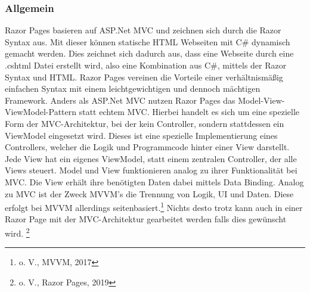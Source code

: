 \documentclass[a4paper,
12pt,
oneside]
{article}
\begin{document}
	\subsubsection{Allgemein}
	Razor Pages basieren auf ASP.Net MVC und zeichnen sich durch die Razor Syntax aus. Mit dieser können statische HTML Webseiten mit C\# dynamisch gemacht werden. Dies zeichnet sich dadurch aus, dass eine Webseite durch eine .cshtml Datei erstellt wird, also eine Kombination aus C\#, mittels der Razor Syntax und HTML. Razor Pages vereinen die Vorteile einer verhältnismäßig einfachen Syntax mit einem leichtgewichtigen und dennoch mächtigen Framework. Anders als ASP.Net MVC nutzen Razor Pages das Model-View-ViewModel-Pattern statt echtem MVC. Hierbei handelt es sich um eine spezielle Form der MVC-Architektur, bei der kein Controller, sondern stattdessen ein ViewModel eingesetzt wird. Dieses ist eine spezielle Implementierung eines Controllers, welcher die Logik und Programmcode hinter einer View darstellt. Jede View hat ein eigenes ViewModel, statt einem zentralen Controller, der alle Views steuert. Model und View funktionieren analog zu ihrer Funktionalität bei MVC. Die View erhält ihre benötigten Daten dabei mittels Data Binding. Analog zu MVC ist der Zweck MVVM's die Trennung von Logik, UI und Daten. Diese erfolgt bei MVVM allerdings seitenbasiert.\footnote{o. V., MVVM, 2017} Nichts desto trotz kann auch in einer Razor Page mit der MVC-Architektur gearbeitet werden falls dies gewünscht wird. \footnote{o. V., Razor Pages, 2019}
	\clearpage
	
\end{document}

